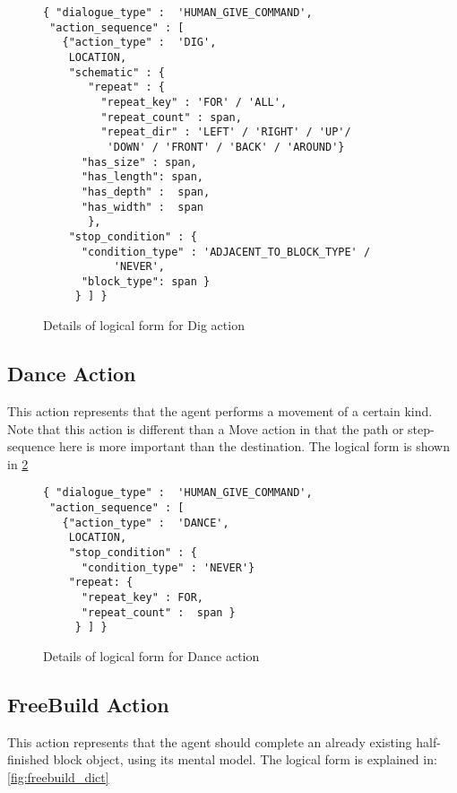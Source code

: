 \begin{figure}[ht]
    \centering
    \fontsize{8pt}{8pt}\selectfont
    \begin{verbatim}
{ "dialogue_type" :  'HUMAN_GIVE_COMMAND',
 "action_sequence" : [
   {"action_type" :  'DIG',
    LOCATION,
    "schematic" : {
       "repeat" : {
         "repeat_key" : 'FOR' / 'ALL',
         "repeat_count" : span,
         "repeat_dir" : 'LEFT' / 'RIGHT' / 'UP'/ 
          'DOWN' / 'FRONT' / 'BACK' / 'AROUND'}
      "has_size" : span,
      "has_length": span,
      "has_depth" :  span,
      "has_width" :  span
       },
    "stop_condition" : {
      "condition_type" : 'ADJACENT_TO_BLOCK_TYPE' /
           'NEVER',
      "block_type": span }
     } ] }
    \end{verbatim}
    \vspace{-20pt}
    \caption{Details of logical form  for Dig action}
    \vspace{-8pt}
    \label{fig:dig_dict}
\end{figure}


\subsection{Dance Action}
This action represents that the agent performs a movement of a certain kind. Note that this action is different than a Move action in that the path or step-sequence here is more important than the destination. The logical form is shown in \ref{fig:dance_dict}

\begin{figure}[ht]
    \centering
    \fontsize{8pt}{8pt}\selectfont
    \begin{verbatim}
{ "dialogue_type" :  'HUMAN_GIVE_COMMAND',
 "action_sequence" : [
   {"action_type" :  'DANCE',
    LOCATION,
    "stop_condition" : {
      "condition_type" : 'NEVER'}
    "repeat: {
      "repeat_key" : FOR,
      "repeat_count" :  span }
     } ] }
    \end{verbatim}
    \vspace{-20pt}
    \caption{Details of logical form for Dance action}
    \vspace{-8pt}
    \label{fig:dance_dict}
\end{figure}

\subsection{FreeBuild Action}
This action represents that the agent should complete an already existing half-finished block object, using its mental model. The logical form is explained in: \ref{fig:freebuild_dict}

